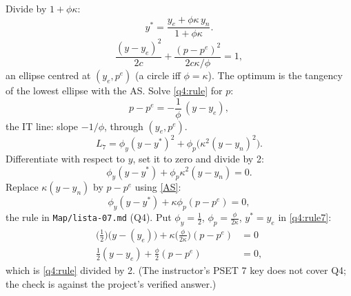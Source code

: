 \begin{sol}
Divide by $1+\phi\kappa$:
\begin{equation}
y^*=\frac{y_e+\phi\kappa\,y_n}{1+\phi\kappa}. \label{q4:ystar}
\end{equation}
\begin{equation}
\frac{(y-y_e)^2}{2c}+\frac{(p-p^e)^2}{2c\kappa/\phi}=1 , \nonumber
\end{equation}
an ellipse centred at $(y_e,p^e)$ (a circle iff $\phi=\kappa$). The optimum is the tangency of the lowest ellipse with the AS. Solve
\eqref{q4:rule} for $p$:
\begin{equation}
p-p^e=-\frac1\phi\,(y-y_e) , \label{q4:IT}
\end{equation}
the IT line: slope $-1/\phi$, through $(y_e,p^e)$.
\begin{equation}
L_7=\phi_y(y-y^*)^2+\phi_p\big(\kappa^2(y-y_n)^2\big) . \nonumber
\end{equation}
Differentiate with respect to $y$, set it to zero and divide by 2:
\begin{equation}
\phi_y(y-y^*)+\phi_p\kappa^2(y-y_n)=0 . \nonumber
\end{equation}
Replace $\kappa(y-y_n)$ by $p-p^e$ using \eqref{AS}:
\begin{equation}
\phi_y(y-y^*)+\kappa\phi_p(p-p^e)=0 , \label{q4:rule7}
\end{equation}
the rule in \texttt{Map/lista-07.md} (Q4). Put $\phi_y=\frac12$, $\phi_p=\frac{\phi}{2\kappa}$, $y^*=y_e$ in \eqref{q4:rule7}:
\begin{align}
\big(\tfrac12\big)\big(y-(y_e)\big)+\kappa\big(\tfrac{\phi}{2\kappa}\big)(p-p^e)&=0\nonumber\\
\tfrac12(y-y_e)+\tfrac\phi2(p-p^e)&=0 , \nonumber
\end{align}
which is \eqref{q4:rule} divided by 2. (The instructor's PSET 7 key does not cover Q4; the check is against the project's verified answer.)
\end{sol}

